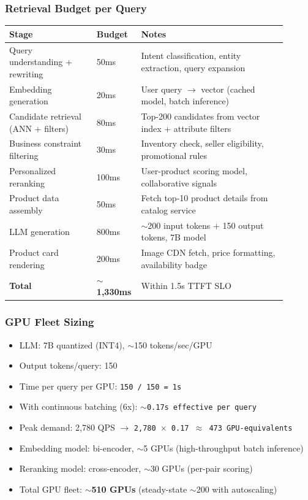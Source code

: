 \subsubsection*{Retrieval Budget per Query}

\begin{tabular}{|p{0.30\linewidth}|p{0.10\linewidth}|p{0.50\linewidth}|}
\hline
\textbf{Stage} & \textbf{Budget} & \textbf{Notes} \\
\hline
Query understanding + rewriting & 50ms & Intent classification, entity extraction, query expansion \\
\hline
Embedding generation & 20ms & User query $\rightarrow$ vector (cached model, batch inference) \\
\hline
Candidate retrieval (ANN + filters) & 80ms & Top-200 candidates from vector index + attribute filters \\
\hline
Business constraint filtering & 30ms & Inventory check, seller eligibility, promotional rules \\
\hline
Personalized reranking & 100ms & User-product scoring model, collaborative signals \\
\hline
Product data assembly & 50ms & Fetch top-10 product details from catalog service \\
\hline
LLM generation & 800ms & $\sim$200 input tokens + 150 output tokens, 7B model \\
\hline
Product card rendering & 200ms & Image CDN fetch, price formatting, availability badge \\
\hline
\textbf{Total} & \textbf{$\sim$1,330ms} & Within 1.5s TTFT SLO \\
\hline
\end{tabular}

\subsubsection*{GPU Fleet Sizing}

\begin{itemize}
  \item LLM: 7B quantized (INT4), $\sim$150 tokens/sec/GPU
  \item Output tokens/query: 150
  \item Time per query per GPU: \texttt{150 / 150 = 1s}
  \item With continuous batching (6x): \texttt{$\sim$0.17s effective per query}
  \item Peak demand: 2,780 QPS $\rightarrow$ \texttt{2,780 $\times$ 0.17 $\approx$ 473 GPU-equivalents}
  \item Embedding model: bi-encoder, $\sim$5 GPUs (high-throughput batch inference)
  \item Reranking model: cross-encoder, $\sim$30 GPUs (per-pair scoring)
  \item Total GPU fleet: \textbf{$\sim$510 GPUs} (steady-state $\sim$200 with autoscaling)
\end{itemize}

